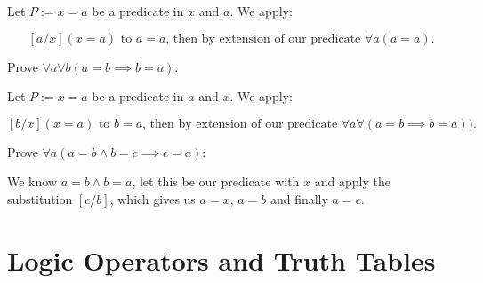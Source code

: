 Let \(P:= x = a\) be a predicate in \(x\) and \(a\). We apply:

\[
	[a /x](x = a) \text{ to } a = a \text{, then by extension of our predicate } \forall a (a = a).
\]

Prove \(\forall a \forall b (a = b \implies b = a )\):

Let \(P:= x = a\) be a predicate in \(a\) and \(x\). We apply:

\[
	[b / x](x = a) \text{ to } b = a \text{, then by extension of our predicate } \forall a \forall ( a = b \implies b = a )).
\]

\QED

Prove \(\forall a (a = b \land b = c \implies c = a)\):

We know \(a = b \land b = a\), let this be our predicate with \(x\) and apply the substitution \([c/b]\), which gives
us \(a = x\), \(a = b\) and finally \(a = c\).

\QED

\section{Logic Operators and Truth Tables}

